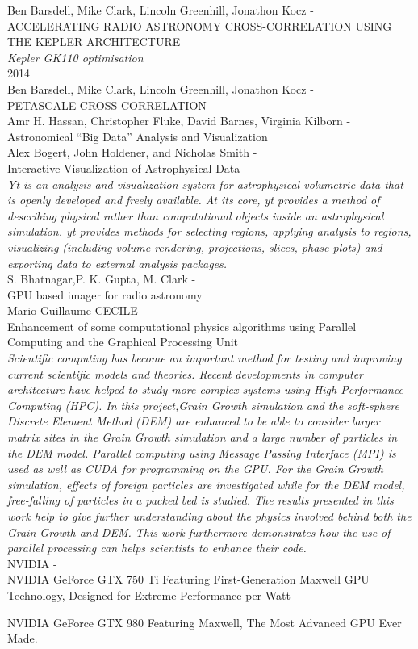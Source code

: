 \noindent
{\large Ben Barsdell, Mike Clark, Lincoln Greenhill, Jonathon Kocz - \hfill \\ ACCELERATING RADIO ASTRONOMY CROSS-CORRELATION USING THE KEPLER ARCHITECTURE  }\\
\indent \textit{Kepler GK110 optimisation
}\\

\noindent
{\large 2014}\\
\noindent
{\large Ben Barsdell, Mike Clark, Lincoln Greenhill, Jonathon Kocz - \hfill \\ PETASCALE CROSS-CORRELATION }\\

\noindent
{\large Amr H. Hassan, Christopher Fluke, David Barnes, Virginia Kilborn - \hfill \\ Astronomical “Big Data” Analysis and Visualization }\\

\noindent
{\large Alex Bogert, John Holdener, and Nicholas Smith - \hfill \\ Interactive Visualization of Astrophysical Data }\\
\indent \textit{Yt is an analysis and visualization system for astrophysical volumetric data
that is openly developed and freely available. At its core, yt provides a method of
describing physical rather than computational objects inside an astrophysical
simulation. yt provides methods for selecting regions, applying analysis to regions,
visualizing (including volume rendering, projections, slices, phase plots) and
exporting data to external analysis packages.
}\\

\noindent
{\large S. Bhatnagar,P. K. Gupta, M. Clark - \hfill \\ GPU based imager for radio astronomy }\\

\noindent
{\large Mario Guillaume CECILE - \hfill \\ Enhancement of some computational physics algorithms using Parallel Computing and the Graphical Processing Unit}\\
\indent \textit{Scientific computing has become an important method for testing and improving current scientific models and theories. Recent developments in computer architecture have helped to study more complex systems using High Performance Computing (HPC). In this project,Grain Growth simulation and the soft-sphere Discrete Element Method (DEM) are enhanced to be able to consider larger matrix sites in the Grain Growth simulation and a large number of particles in the DEM model. Parallel computing using Message Passing Interface (MPI) is used as well as CUDA for programming on the GPU. For the Grain Growth simulation, effects of foreign particles are investigated while for the DEM model, free-falling of particles in a packed bed is studied. The results presented in this work help to give further understanding about the physics involved behind both the Grain Growth and DEM. This work furthermore demonstrates how the use of parallel processing can helps scientists to enhance their code.
}\\

\noindent
{\large NVIDIA - \hfill \\
NVIDIA GeForce GTX 750 Ti
Featuring First-Generation Maxwell GPU Technology, Designed for Extreme Performance per Watt}

NVIDIA GeForce GTX 980
Featuring Maxwell, The Most Advanced GPU Ever Made.